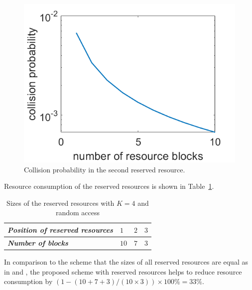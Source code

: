 \documentclass{ieeeaccess}
\begin{document}
\begin{figure}[htbp]
\centerline{\includegraphics[scale=0.35]{fig13.png}}
\caption{Collision probability in the second reserved resource.}
\vspace{-2mm}
\label{fig13}

\end{figure}

Resource consumption of the reserved resources is shown in Table~\ref{tab3}.

\begin{table}[htbp]
\caption{Sizes of the reserved resources with $K=4$ and random access}
\begin{center}
\begin{tabular}{|p{10em}|p{2em}|p{2em}|p{2em}|}
 \hline
 \textbf{\textit{Position of reserved resources}} & $1$ &$2$ &$3$ \\ 
 \hline
 \textbf{\textit{Number of blocks}} & $10$ &$7$ &$3$ \\

 
 \hline
\end{tabular}
\label{tab3}
\vspace{-2mm}
\end{center}

\end{table}

In comparison to the scheme that the sizes of all reserved resources are equal as in \cite{ref10} and \cite{ref11}, the proposed scheme with reserved resources helps to reduce resource consumption by $(1 - (10+7+3)/(10\times3))\times100\% = 33\%$.
\end{document}
